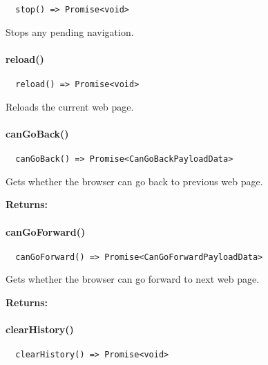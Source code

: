 \begin{verbatim}
  stop() => Promise<void>
\end{verbatim}

Stops any pending navigation.


\paragraph{reload()}

\begin{verbatim}
  reload() => Promise<void>
\end{verbatim}

Reloads the current web page.


\paragraph{canGoBack()}

\begin{verbatim}
  canGoBack() => Promise<CanGoBackPayloadData>
\end{verbatim}

Gets whether the browser can go back to previous web page.

\textbf{Returns:} 


\paragraph{canGoForward()}

\begin{verbatim}
  canGoForward() => Promise<CanGoForwardPayloadData>
\end{verbatim}

Gets whether the browser can go forward to next web page.

\textbf{Returns:} 


\newpage

\paragraph{clearHistory()}

\begin{verbatim}
  clearHistory() => Promise<void>
\end{verbatim}

